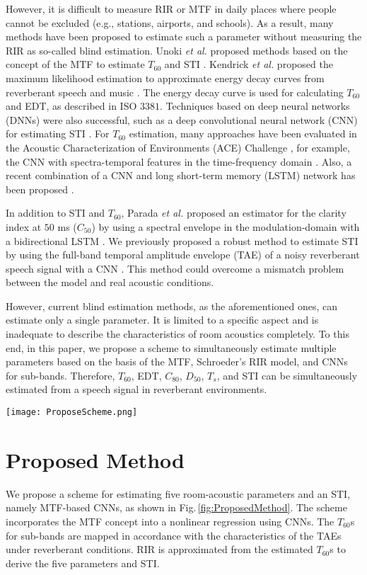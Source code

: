 \documentclass[conference]{IEEEtran}
\begin{document}
	However, it is difficult to measure RIR or MTF in daily places where people cannot be excluded (e.g., stations, airports, and schools). As a result, many methods have been proposed to estimate such a parameter without measuring the RIR as so-called blind estimation. Unoki {\it et al.} proposed methods based on the concept of the MTF to estimate $T_{60}$ and STI \cite{MU_T60,MU_STI_EUSIPCO13, MU_STI}. Kendrick {\it et al.} proposed the maximum likelihood estimation to approximate energy decay curves from reverberant speech and music \cite{Kendrick}. The energy decay curve is used for calculating $T_{60}$ and EDT, as described in ISO $3381$. Techniques based on deep neural networks (DNNs) were also successful, such as a deep convolutional neural network (CNN) for estimating STI \cite{Prem}. For $T_{60}$ estimation, many approaches have been evaluated in the Acoustic Characterization of Environments (ACE) Challenge \cite{ACE}, for example, the CNN with spectra-temporal features in the time-frequency domain \cite{CNN_T60}. Also, a recent combination of a CNN and long short-term memory (LSTM) network has been proposed \cite{deng2020IS}. 
	
	In addition to STI and $T_{60}$, Parada {\it et al.} proposed an estimator for the clarity index at $50$ ms ($C_{50}$) by using a spectral envelope in the modulation-domain with a bidirectional LSTM \cite{Parada}. We previously proposed a robust method to estimate STI by using the full-band temporal amplitude envelope (TAE) of a noisy reverberant speech signal with a CNN \cite{Me_APSIPA2019}. This method could overcome a mismatch problem between the model and real acoustic conditions.%
	
	However, current blind estimation methods, as the aforementioned ones, can estimate only a single parameter. It is limited to a specific aspect and is inadequate to describe the characteristics of room acoustics completely. To this end, in this paper, we propose a scheme to simultaneously estimate multiple parameters based on the basis of the MTF, Schroeder's RIR model, and CNNs for sub-bands. Therefore, $T_{60}$, EDT, $C_{80}$, $D_{50}$, $T_s$, and STI can be simultaneously estimated from a speech signal in reverberant environments.
	\begin{figure*}[ht]
		\centering
		\texttt{[image: ProposeScheme.png]}
		\caption{Block diagram of proposed method.}
		\label{fig:ProposedMethod}
	\end{figure*}
	
	\section{Proposed Method}
	We propose a scheme for estimating five room-acoustic parameters and an STI, namely MTF-based CNNs, as shown in Fig.\,\ref{fig:ProposedMethod}. The scheme incorporates the MTF concept into a nonlinear regression using CNNs. The $T_{60}$s for sub-bands are mapped in accordance with the characteristics of the TAEs under reverberant conditions. RIR is approximated from the estimated $T_{60}$s to derive the five parameters and STI.  
	
\end{document}
